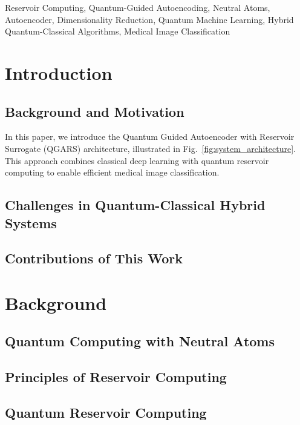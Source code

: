 \documentclass[conference]{IEEEtran}
\begin{document}
\begin{IEEEkeywords}
Reservoir Computing, Quantum-Guided Autoencoding,
Neutral Atoms, Autoencoder, Dimensionality Reduction, 
Quantum Machine Learning, Hybrid Quantum-Classical Algorithms, 
Medical Image Classification
\end{IEEEkeywords}

\section{Introduction}


\subsection{Background and Motivation}

In this paper, we introduce the Quantum Guided Autoencoder with Reservoir Surrogate (QGARS) architecture, illustrated in Fig.~\ref{fig:system_architecture}. This approach combines classical deep learning with quantum reservoir computing to enable efficient medical image classification.

\subsection{Challenges in Quantum-Classical Hybrid Systems}
\subsection{Contributions of This Work}

\section{Background}
\subsection{Quantum Computing with Neutral Atoms}
\subsection{Principles of Reservoir Computing}
\subsection{Quantum Reservoir Computing}
\end{document}
